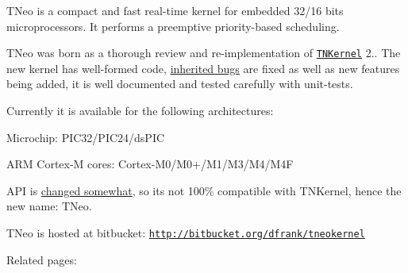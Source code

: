 T\+Neo is a compact and fast real-\/time kernel for embedded 32/16 bits microprocessors. It performs a preemptive priority-\/based scheduling.

T\+Neo was born as a thorough review and re-\/implementation of \href{http://tnkernel.com}{\tt T\+N\+Kernel} 2.. The new kernel has well-\/formed code, \hyperlink{why_reimplement_why_reimplement__bugs}{inherited bugs} are fixed as well as new features being added, it is well documented and tested carefully with unit-\/tests.

Currently it is available for the following architectures\+:


\begin{DoxyItemize}
\item Microchip\+: P\+I\+C32/\+P\+I\+C24/ds\+P\+IC
\item A\+RM Cortex-\/M cores\+: Cortex-\/\+M0/\+M0+/\+M1/\+M3/\+M4/\+M4F
\end{DoxyItemize}

A\+PI is \hyperlink{tnkernel_diff}{changed somewhat}, so it\textquotesingle{}s not 100\% compatible with T\+N\+Kernel, hence the new name\+: T\+Neo.

T\+Neo is hosted at bitbucket\+: \href{http://bitbucket.org/dfrank/tneokernel}{\tt http\+://bitbucket.\+org/dfrank/tneokernel}

Related pages\+:


